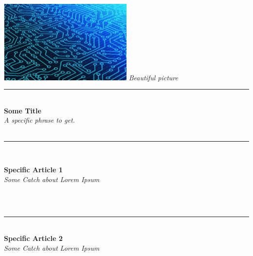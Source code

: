 \documentclass[11pt,twoside,a4paper]{article}
\begin{document}
\begin{multicols}{2}

\small

\includegraphics[width=0.50\textwidth]{../../images/62129055_10219405317945563_2140020562502615040_n.jpg}
{\centering \emph{Beautiful picture} } 

{\centering \rule{0.34\textwidth}{1pt} }~\\

\textbf{Some Title}~\\
\emph{A specific phrase to get. }~\\

\lipsum[1-3] ~\\ %


{\centering \rule{0.34\textwidth}{1pt} }~\\

	\begin{multicols}{2}
	
		\textbf{Specific Article 1}~\\
		\emph{Some Catch about Lorem Ipsum}~\\
		
		\lipsum[1-2]~\\
	
	\end{multicols}
	
	\vfill~\\ \columnbreak
	
	{\centering \rule{0.34\textwidth}{1pt} }~\\
	
	\textbf{Specific Article 2}~\\
	\emph{Some Catch about Lorem Ipsum}~\\
	
	\lipsum[2-5]
	
	\vfill~\\ \columnbreak
	
	\vfill~\\ \columnbreak

\end{multicols}
\end{document}
